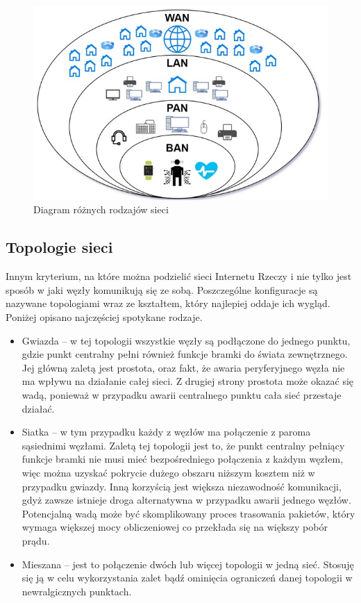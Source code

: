 \documentclass[12pt, twoside, openany]{mwrep}
\begin{document}
\begin{figure}[H]
\centering
\includegraphics[scale=0.9]{rodzaje_sieci}
\caption{Diagram różnych rodzajów sieci}
\end{figure}

\subsection{Topologie sieci}

Innym kryterium, na które można podzielić sieci Internetu Rzeczy i nie tylko jest sposób w jaki węzły komunikują się ze sobą. Poszczególne konfiguracje są nazywane topologiami wraz ze kształtem, który najlepiej oddaje ich wygląd. Poniżej opisano najczęściej spotykane rodzaje.
\begin{itemize}
    \item Gwiazda – w tej topologii wszystkie węzły są podłączone do jednego punktu, gdzie punkt centralny pełni również funkcje bramki do świata zewnętrznego. Jej główną zaletą jest prostota, oraz fakt, że awaria peryferyjnego węzła nie ma wpływu na działanie całej sieci. Z drugiej strony prostota może okazać się wadą, ponieważ w przypadku awarii centralnego punktu cała sieć przestaje działać.
    \item Siatka – w tym przypadku każdy z węzłów ma połączenie z paroma sąsiednimi węzłami. Zaletą tej topologii jest to, że punkt centralny pełniący funkcje bramki nie musi mieć bezpośredniego połączenia z każdym węzłem, więc można uzyskać pokrycie dużego obszaru niższym kosztem niż w przypadku gwiazdy. Inną korzyścią jest większa niezawodność komunikacji, gdyż zawsze istnieje droga alternatywna w przypadku awarii jednego węzłów. Potencjalną wadą może być skomplikowany proces trasowania pakietów, który wymaga większej mocy obliczeniowej co przekłada się na większy pobór prądu.
    \item Mieszana – jest to połączenie dwóch lub więcej topologii w jedną sieć. Stosuję się ją w celu wykorzystania zalet bądź ominięcia ograniczeń danej topologii w newralgicznych punktach.
\end{itemize}
\end{document}
